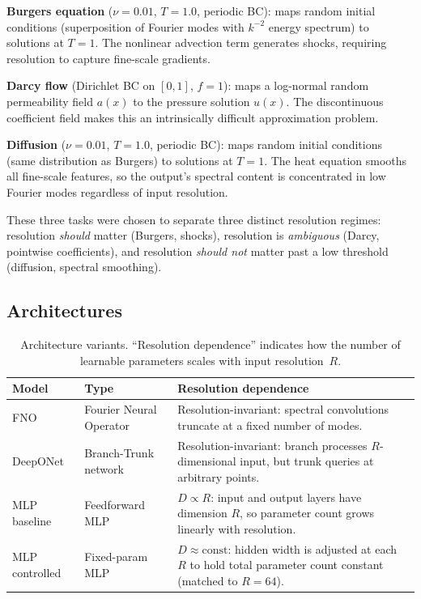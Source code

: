 \documentclass[11pt]{article}
\begin{document}
\noindent
\textbf{Burgers equation} ($\nu = 0.01$, $T = 1.0$, periodic BC):
maps random initial conditions (superposition of Fourier modes with
$k^{-2}$ energy spectrum) to solutions at $T = 1$. The nonlinear
advection term generates shocks, requiring resolution to capture
fine-scale gradients.

\textbf{Darcy flow} (Dirichlet BC on $[0, 1]$, $f = 1$):
maps a log-normal random permeability field $a(x)$ to the pressure
solution $u(x)$. The discontinuous coefficient field makes this an
intrinsically difficult approximation problem.

\textbf{Diffusion} ($\nu = 0.01$, $T = 1.0$, periodic BC):
maps random initial conditions (same distribution as Burgers) to
solutions at $T = 1$. The heat equation smooths all fine-scale
features, so the output's spectral content is concentrated in low
Fourier modes regardless of input resolution.

These three tasks were chosen to separate three distinct resolution
regimes: resolution \emph{should} matter (Burgers, shocks),
resolution is \emph{ambiguous} (Darcy, pointwise coefficients), and
resolution \emph{should not} matter past a low threshold (diffusion,
spectral smoothing).

\subsection{Architectures}
\label{sec:architectures}

\begin{table}[h]
\centering
\caption{Architecture variants. ``Resolution dependence'' indicates
how the number of learnable parameters scales with input resolution~$R$.}
\label{tab:models}
\begin{tabular}{@{}llp{7cm}@{}}
\toprule
\textbf{Model} & \textbf{Type} & \textbf{Resolution dependence} \\
\midrule
FNO & Fourier Neural Operator & Resolution-invariant: spectral
convolutions truncate at a fixed number of modes. \\
DeepONet & Branch-Trunk network & Resolution-invariant: branch
processes $R$-dimensional input, but trunk queries at arbitrary
points. \\
MLP baseline & Feedforward MLP & $D \propto R$: input and output
layers have dimension $R$, so parameter count grows linearly with
resolution. \\
MLP controlled & Fixed-param MLP & $D \approx \mathrm{const}$:
hidden width is adjusted at each $R$ to hold total parameter count
constant (matched to $R = 64$). \\
\bottomrule
\end{tabular}
\end{table}
\end{document}

